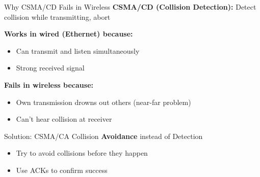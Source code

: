 \documentclass[aspectratio=169,11pt]{beamer}
\begin{document}
\begin{frame}{Why CSMA/CD Fails in Wireless}
    \textbf{CSMA/CD (Collision Detection):} Detect collision while transmitting, abort
    
    \vspace{0.3cm}
    \textbf{Works in wired (Ethernet) because:}
    \begin{itemize}
        \item Can transmit and listen simultaneously
        \item Strong received signal
    \end{itemize}
    
    \textbf{Fails in wireless because:}
    \begin{itemize}
        \item Own transmission drowns out others (near-far problem)
        \item Can't hear collision at receiver
    \end{itemize}
    
    \begin{alertblock}{Solution: CSMA/CA}
        Collision \textbf{Avoidance} instead of Detection
        \begin{itemize}
            \item Try to avoid collisions before they happen
            \item Use ACKs to confirm success
        \end{itemize}
    \end{alertblock}
\end{frame}
\end{document}
